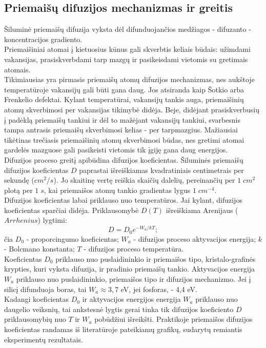 \documentclass[11pt,a4paper]{article}
\begin{document}
\subsection{Priemaišų difuzijos mechanizmas ir greitis}
Šiluminė priemaišų difuzija vyksta dėl difunduojančios medžiagos - difuzanto - koncentracijos gradiento.\\
Priemaišiniai atomai į kietuosius kūnus gali skverbtis keliais būdais: užimdami vakansijas, prasiskverbdami tarp mazgų ir pasikeisdami vietomis su gretimais atomais.\\
Tikimiausias yra pirmasis priemaišų atomų difuzijos mechanizmas, nes aukštoje temperatūroje vakansijų gali būti gana daug. 
Jos atsiranda kaip Šotkio arba Frenkelio defektai. Kylant temperatūrai, vakansijų tankis auga, priemaišinių atomų skverbimosi per 
vakansijas tikimybė didėja. Beje, didėjant prasiskverbusių į padėklą priemaišų tankiui ir dėl to mažėjant vakansijų tankiui, svarbesnis 
tampa antrasis priemaišų skverbimosi kelias - per tarpmazgius. Mažiausiai tikėtinas trečiasis priemaišinių atomų skverbimosi būdas, nes 
gretimi atomai gardelės mazguose gali pasikeisti vietomis tik įgiję gana daug energijos.\\
Difuzijos proceso greitį apibūdina difuzijos koeficientas. Šiluminės priemaišų difuzijos koeficientas $D$ paprastai išreiškiamas 
kvadratiniais centimetrais per sekundę ($cm^2/s$). Jo skaitinę vertę reiškia skaičių dalelių, pereinančių per $1\;cm^2$ plotą 
per $1\;s$, kai priemaišos atomų tankio gradientas lygus $1\;cm^{-4}$.\\
Difuzijos koeficientas labai priklauso nuo temperatūros. Jai kylant, difuzijos koeficientas sparčiai didėja. 
Priklausomybė $D(T)$ išreiškiama Arenijaus ($Arrhenius$) lygtimi:\\
\[D = D_0 e^{-W_a/kT};\]
čia $D_0$ - proporcingumo koeficientas; $W_a$ - difuzijos proceso aktyvacijos energija; $k$ - Bolcmano konstanta; $T$ - difuzijos proceso temperatūra.\\
Koeficientas $D_0$ priklauso nuo puslaidininkio ir priemaišos tipo, kristalo-grafinės krypties, 
kuri vyksta difuzija, ir pradinio priemaišų tankio. Aktyvacijos energija $W_a$ priklauso nuo puslaidininkio, 
priemaišos tipo ir difuzijos mechanizmo. Jei į silicį difunduoja boras, tai $W_a \approx 3,7$ eV, jei fosforas, - 4,4 eV.\\
Kadangi koeficientas $D_0$ ir aktyvacijos energijos energija $W_a$ priklauso nuo daugelio veiksnių, 
tai ankstesnė lygtis gerai tinka tik difuzijos koeficiento $D$ priklausomybių nuo $T$ ir $W_a$ pobūdžiui išreikšti. 
Praktikoje priemaišos difuzijos koeficientas randamas iš literatūroje pateikiamų grafikų, sudarytų remiantis eksperimentų rezultatais.
\end{document}
